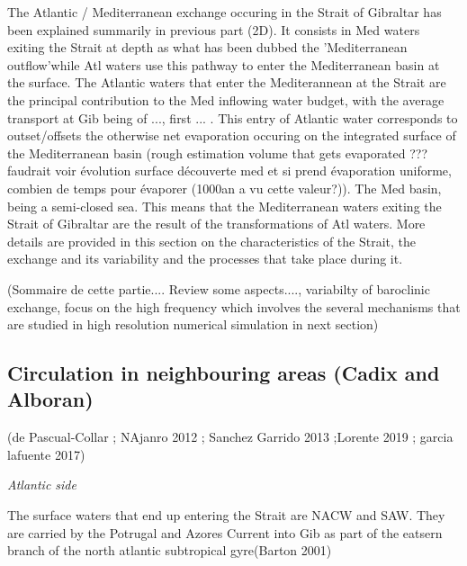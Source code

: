 The Atlantic / Mediterranean exchange occuring in the Strait of Gibraltar has been explained summarily in previous part (2D). It consists in Med waters exiting the Strait at depth as what has been dubbed the 'Mediterranean outflow'while Atl waters use this pathway to enter the Mediterranean basin at the surface.
The Atlantic waters that enter the Mediterannean at the Strait are the principal contribution to the Med inflowing water budget, with the average transport at Gib being of ..., first ... . This entry of Atlantic water corresponds to outset/offsets the otherwise net evaporation occuring on the integrated surface of the Mediterranean basin (rough estimation volume that gets evaporated ??? faudrait voir évolution surface découverte med et si prend évaporation uniforme, combien de temps pour évaporer (1000an a vu cette valeur?)). The Med basin, being a semi-closed sea. This means that the Mediterranean waters exiting the Strait of Gibraltar are the result of the transformations of Atl waters.
More details are provided in this section on the characteristics of the Strait, the exchange and its variability and the processes that take place during it.



(Sommaire de cette partie.... Review some aspects...., variabilty of baroclinic exchange, focus on the high frequency which involves the several mechanisms that are studied in high resolution numerical simulation in next section)







\subsection{Circulation in neighbouring areas (Cadix and Alboran)}

(de Pascual-Collar ; NAjanro 2012 ; Sanchez Garrido 2013 ;Lorente 2019 ; garcia lafuente 2017)


\textit{Atlantic side}

The surface waters that end up entering the Strait are NACW and SAW. They are carried by the Potrugal and Azores Current into Gib as part of the eatsern branch of the north atlantic subtropical gyre(Barton 2001)

